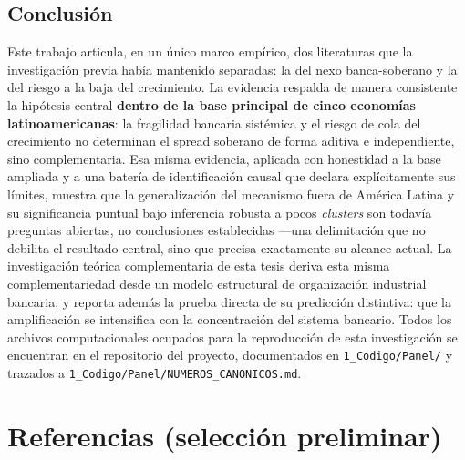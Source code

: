 \documentclass[5p,times,twocolumn,authoryear]{elsarticle}
\begin{document}
\subsection{Conclusión}

Este trabajo articula, en un único marco empírico, dos literaturas que la investigación previa había mantenido separadas: la del nexo banca-soberano y la del riesgo a la baja del crecimiento. La evidencia respalda de manera consistente la hipótesis central \textbf{dentro de la base principal de cinco economías latinoamericanas}: la fragilidad bancaria sistémica y el riesgo de cola del crecimiento no determinan el spread soberano de forma aditiva e independiente, sino complementaria. Esa misma evidencia, aplicada con honestidad a la base ampliada y a una batería de identificación causal que declara explícitamente sus límites, muestra que la generalización del mecanismo fuera de América Latina y su significancia puntual bajo inferencia robusta a pocos \textit{clusters} son todavía preguntas abiertas, no conclusiones establecidas —una delimitación que no debilita el resultado central, sino que precisa exactamente su alcance actual. La investigación teórica complementaria de esta tesis deriva esta misma complementariedad desde un modelo estructural de organización industrial bancaria, y reporta además la prueba directa de su predicción distintiva: que la amplificación se intensifica con la concentración del sistema bancario. Todos los archivos computacionales ocupados para la reproducción de esta investigación se encuentran en el repositorio del proyecto, documentados en \texttt{1\_Codigo/Panel/} y trazados a \texttt{1\_Codigo/Panel/NUMEROS\_CANONICOS.md}.

\section*{Referencias (selección preliminar)}
\end{document}
